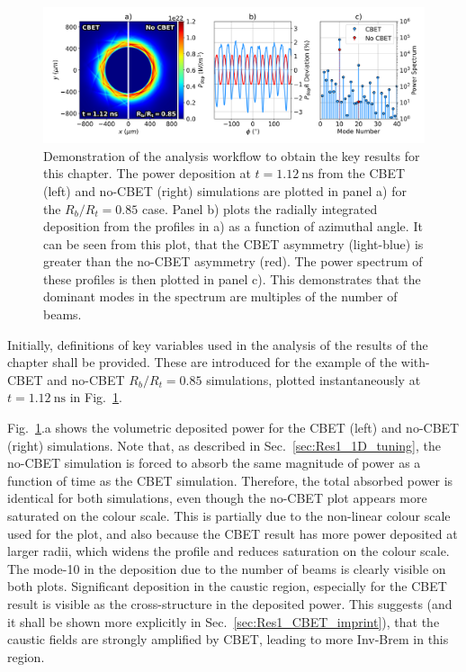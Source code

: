 \begin{figure}[t!]
    \includegraphics[width=\linewidth]{Results1/Images/Mode_analysis.png}
    \centering
    \caption{Demonstration of the analysis workflow to obtain the key results for this chapter.
    The power deposition at $t=1.12\ \text{ns}$ from the \ac{CBET} (left) and no-\ac{CBET} (right) simulations are plotted in panel a) for the $R_b/R_t=0.85$ case.
    Panel b) plots the radially integrated deposition from the profiles in a) as a function of azimuthal angle.
    It can be seen from this plot, that the \ac{CBET} asymmetry (light-blue) is greater than the no-\ac{CBET} asymmetry (red).
    The power spectrum of these profiles is then plotted in panel c).
    This demonstrates that the dominant modes in the spectrum are multiples of the number of beams.}%
    \label{fig:Res1_analysis}
\end{figure}

Initially, definitions of key variables used in the analysis of the results of the chapter shall be provided.
These are introduced for the example of the with-\ac{CBET} and no-\ac{CBET} $R_b/R_t=0.85$ simulations, plotted instantaneously at $t=1.12\ \text{ns}$ in Fig.~\ref{fig:Res1_analysis}.

Fig.~\ref{fig:Res1_analysis}.a shows the volumetric deposited power for the \ac{CBET} (left) and no-\ac{CBET} (right) simulations.
Note that, as described in Sec.~\ref{sec:Res1_1D_tuning}, the no-\ac{CBET} simulation is forced to absorb the same magnitude of power as a function of time as the \ac{CBET} simulation.
Therefore, the total absorbed power is identical for both simulations, even though the no-\ac{CBET} plot appears more saturated on the colour scale.
This is partially due to the non-linear colour scale used for the plot, and also because the \ac{CBET} result has more power deposited at larger radii, which widens the profile and reduces saturation on the colour scale.
The mode-10 in the deposition due to the number of beams is clearly visible on both plots.
Significant deposition in the caustic region, especially for the \ac{CBET} result is visible as the cross-structure in the deposited power.
This suggests (and it shall be shown more explicitly in Sec.~\ref{sec:Res1_CBET_imprint}), that the caustic fields are strongly amplified by \ac{CBET}, leading to more \ac{Inv-Brem} in this region.

